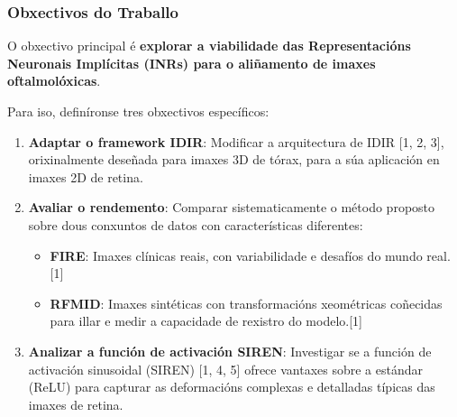\documentclass[xcolor=dvipsnames]{beamer}
\begin{document}
\begin{frame}
    \frametitle{Obxectivos do Traballo}
    
    O obxectivo principal é \textbf{explorar a viabilidade das Representacións Neuronais Implícitas (INRs) para o aliñamento de imaxes oftalmolóxicas}.
    
    \vspace{0.5cm}
    
    Para iso, definíronse tres obxectivos específicos:
    
    \begin{enumerate}
        \item \textbf{Adaptar o framework IDIR}: Modificar a arquitectura de IDIR [1, 2, 3], orixinalmente deseñada para imaxes 3D de tórax, para a súa aplicación en imaxes 2D de retina.
        
        \vspace{0.4cm}
        
        \item \textbf{Avaliar o rendemento}: Comparar sistematicamente o método proposto sobre dous conxuntos de datos con características diferentes:
        \begin{itemize}
            \item \textbf{FIRE}: Imaxes clínicas reais, con variabilidade e desafíos do mundo real.[1]
            \item \textbf{RFMID}: Imaxes sintéticas con transformacións xeométricas coñecidas para illar e medir a capacidade de rexistro do modelo.[1]
        \end{itemize}
        
        \vspace{0.4cm}
        
        \item \textbf{Analizar a función de activación SIREN}: Investigar se a función de activación sinusoidal (SIREN) [1, 4, 5] ofrece vantaxes sobre a estándar (ReLU) para capturar as deformacións complexas e detalladas típicas das imaxes de retina.
    \end{enumerate}
    
\end{frame}
\end{document}
